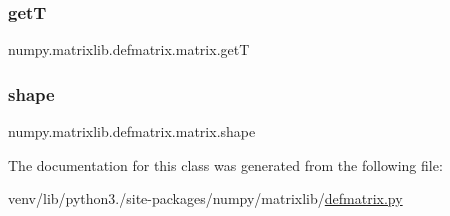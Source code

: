 \subsubsection{\texorpdfstring{getT}{getT}}
{\footnotesize\ttfamily numpy.\+matrixlib.\+defmatrix.\+matrix.\+getT\hspace{0.3cm}{\ttfamily [static]}}

\mbox{\label{classnumpy_1_1matrixlib_1_1defmatrix_1_1matrix_a96c91d30a35f29df99cc776d0de11999}} 
\subsubsection{\texorpdfstring{shape}{shape}}
{\footnotesize\ttfamily numpy.\+matrixlib.\+defmatrix.\+matrix.\+shape}



The documentation for this class was generated from the following file\+:\begin{DoxyCompactItemize}
\item 
venv/lib/python3./site-\/packages/numpy/matrixlib/\hyperlink{defmatrix_8py}{defmatrix.\+py}\end{DoxyCompactItemize}

